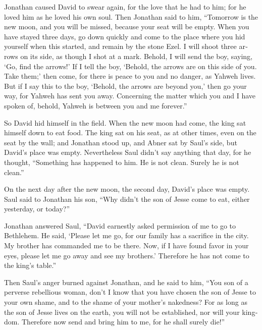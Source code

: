 \begin{paracol}{2}
\begin{otherlanguage}{english}
 Jonathan caused David to swear again, for the love that
he had to him; for he loved him as he loved his own soul.
 Then Jonathan said to him, ``Tomorrow is the new moon,
and you will be missed, because your seat will be empty. 
When you have stayed three days, go down quickly and come to the place
where you hid yourself when this started, and remain by the stone Ezel.
 I will shoot three arrows on its side, as though I shot
at a mark.  Behold, I will send the boy, saying, `Go,
find the arrows!' If I tell the boy, `Behold, the arrows are on this
side of you. Take them;' then come, for there is peace to you and no
danger, as Yahweh lives.  But if I say this to the boy,
`Behold, the arrows are beyond you,' then go your way, for Yahweh has
sent you away.  Concerning the matter which you and I
have spoken of, behold, Yahweh is between you and me forever.''

 So David hid himself in the field. When the new moon had
come, the king sat himself down to eat food.  The king
sat on his seat, as at other times, even on the seat by the wall; and
Jonathan stood up, and Abner sat by Saul's side, but David's place was
empty.  Nevertheless Saul didn't say anything that day,
for he thought, ``Something has happened to him. He is not clean. Surely
he is not clean.''

 On the next day after the new moon, the second day,
David's place was empty. Saul said to Jonathan his son, ``Why didn't the
son of Jesse come to eat, either yesterday, or today?''

 Jonathan answered Saul, ``David earnestly asked
permission of me to go to Bethlehem.  He said, `Please
let me go, for our family has a sacrifice in the city. My brother has
commanded me to be there. Now, if I have found favor in your eyes,
please let me go away and see my brothers.' Therefore he has not come to
the king's table.''

 Then Saul's anger burned against Jonathan, and he said
to him, ``You son of a perverse rebellious woman, don't I know that you
have chosen the son of Jesse to your own shame, and to the shame of your
mother's nakedness?  For as long as the son of Jesse
lives on the earth, you will not be established, nor will your kingdom.
Therefore now send and bring him to me, for he shall surely die!''


\end{otherlanguage}
\end{paracol}
